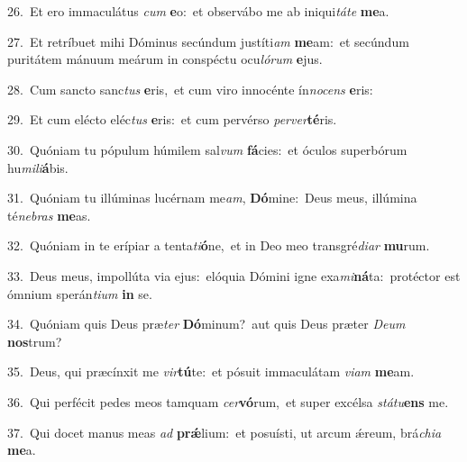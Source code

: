 {\numbfont\textcolor{\numbcolor}{26.}}~Et ero immaculátus \textit{cum} \textbf{e}\-o:~\star et observábo me ab iniqui\-\textit{tá}\-\textit{te} \textbf{me}\-a.\par
{\numbfont\textcolor{\numbcolor}{27.}}~Et retríbuet mihi Dóminus secúndum justíti\textit{am} \textbf{me}\-am:~\star et secúndum puritátem mánuum meárum in conspéctu ocu\-\textit{ló}\-\textit{rum} \textbf{e}\-jus.\par
{\numbfont\textcolor{\numbcolor}{28.}}~Cum sancto sanc\textit{tus} \textbf{e}\-ris,~\star et cum viro innocénte ín\-\textit{no}\-\textit{cens} \textbf{e}\-ris:\par
{\numbfont\textcolor{\numbcolor}{29.}}~Et cum elécto eléc\textit{tus} \textbf{e}\-ris:~\star et cum pervérso \textit{per}\-\textit{ver}\textbf{té}ris.\par
{\numbfont\textcolor{\numbcolor}{30.}}~Quóniam tu pópulum húmilem sal\textit{vum} \textbf{fá}\-cies:~\star et óculos superbórum hu\-\textit{mi}\-\textit{li}\textbf{á}bis.\par
{\numbfont\textcolor{\numbcolor}{31.}}~Quóniam tu illúminas lucérnam me\-\textit{am}\-, \textbf{Dó}\-mine:~\star Deus meus, illúmina té\-\textit{ne}\-\textit{bras} \textbf{me}\-as.\par
{\numbfont\textcolor{\numbcolor}{32.}}~Quóniam in te erípiar a tenta\-\textit{ti}\-\textbf{ó}ne,~\star et in Deo meo transgré\-\textit{di}\-\textit{ar} \textbf{mu}\-rum.\par
{\numbfont\textcolor{\numbcolor}{33.}}~Deus meus, impollúta via ejus:~\dagger elóquia Dómini igne exa\-\textit{mi}\-\textbf{ná}ta:~\star protéctor est ómnium sperán\-\textit{ti}\-\textit{um} \textbf{in} se.\par
{\numbfont\textcolor{\numbcolor}{34.}}~Quóniam quis Deus præ\textit{ter} \textbf{Dó}\-minum?~\star aut quis Deus præter \textit{De}\-\textit{um} \textbf{nos}\-trum?\par
{\numbfont\textcolor{\numbcolor}{35.}}~Deus, qui præcínxit me \textit{vir}\-\textbf{tú}te:~\star et pósuit immaculátam \textit{vi}\-\textit{am} \textbf{me}\-am.\par
{\numbfont\textcolor{\numbcolor}{36.}}~Qui perfécit pedes meos tamquam \textit{cer}\-\textbf{vó}rum,~\star et super excélsa \textit{stá}\-\textit{tu}\textbf{ens} me.\par
{\numbfont\textcolor{\numbcolor}{37.}}~Qui docet manus meas \textit{ad} \textbf{prǽ}\-lium:~\star et posuísti, ut arcum ǽreum, brá\-\textit{chi}\-\textit{a} \textbf{me}\-a.\par
